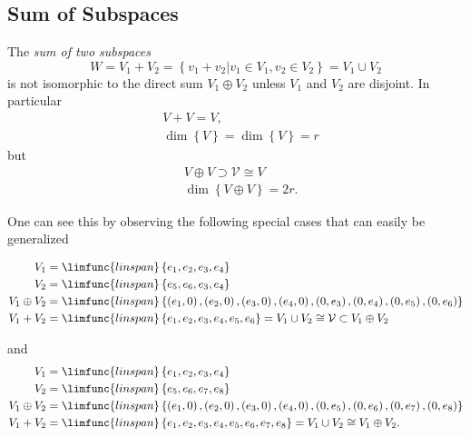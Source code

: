 \documentclass[aps,preprint]{revtex4}
\begin{document}
\subsection{Sum of Subspaces}

The \emph{sum of two subspaces} 
\begin{equation}
W=V_{1}+V_{2}=\left\{ \left. v_{1}+v_{2}\right\vert v_{1}\in V_{1},v_{2}\in
V_{2}\right\} =V_{1}\cup V_{2}
\end{equation}
is not isomorphic to the direct sum $V_{1}\oplus V_{2}$ unless $V_{1}$ and $%
V_{2}$ are disjoint. In particular 
\begin{align}
& V+V=V, \\
& \dim\left\{ V\right\} =\dim\left\{ V\right\} =r
\end{align}
but 
\begin{align}
& V\oplus V\supset\mathcal{V}\cong V \\
& \dim\left\{ V\oplus V\right\} =2r.
\end{align}

One can see this by observing the following special cases that can easily be
generalized

\begin{align}
V_{1} & =\limfunc{linspan}\left\{ e_{1},e_{2},e_{3},e_{4}\right\} \\
V_{2} & =\limfunc{linspan}\left\{ e_{5},e_{6},e_{3},e_{4}\right\} \\
V_{1}\oplus V_{2} & =\limfunc{linspan}\left\{ \left( e_{1},0\right) ,\left(
e_{2},0\right) ,\left( e_{3},0\right) ,\left( e_{4},0\right) ,\left(
0,e_{3}\right) ,\left( 0,e_{4}\right) ,\left( 0,e_{5}\right) ,\left(
0,e_{6}\right) \right\} \\
V_{1}+V_{2} & =\limfunc{linspan}\left\{
e_{1},e_{2},e_{3},e_{4},e_{5},e_{6}\right\} =V_{1}\cup V_{2}\cong\mathcal{V}%
\subset V_{1}\oplus V_{2}
\end{align}

and%
\begin{align}
V_{1} & =\limfunc{linspan}\left\{ e_{1},e_{2},e_{3},e_{4}\right\} \\
V_{2} & =\limfunc{linspan}\left\{ e_{5},e_{6},e_{7},e_{8}\right\} \\
V_{1}\oplus V_{2} & =\limfunc{linspan}\left\{ \left( e_{1},0\right) ,\left(
e_{2},0\right) ,\left( e_{3},0\right) ,\left( e_{4},0\right) ,\left(
0,e_{5}\right) ,\left( 0,e_{6}\right) ,\left( 0,e_{7}\right) ,\left(
0,e_{8}\right) \right\} \\
V_{1}+V_{2} & =\limfunc{linspan}\left\{
e_{1},e_{2},e_{3},e_{4},e_{5},e_{6},e_{7},e_{8}\right\} =V_{1}\cup
V_{2}\cong V_{1}\oplus V_{2}.
\end{align}
\end{document}
